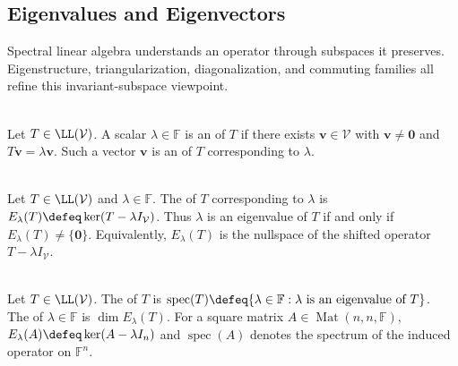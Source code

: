 \subsection{Eigenvalues and Eigenvectors}

%

Spectral linear algebra understands an operator through subspaces it preserves. Eigenstructure, triangularization, diagonalization, and commuting families all refine this invariant-subspace viewpoint.

\begin{definition} \label{def:eigenvalue-eigenvector} \\
Let $T\in\LL(\mathcal{V})$. A scalar $\lambda\in\mathbb{F}$ is an  of $T$ if there exists $\mathbf{v}\in\mathcal{V}$ with $\mathbf{v}\neq\mathbf{0}$ and $T\mathbf{v}=\lambda\mathbf{v}$. Such a vector $\mathbf{v}$ is an  of $T$ corresponding to $\lambda$.
\end{definition}

\begin{definition} \label{def:eigenspace} \\
Let $T\in\LL(\mathcal{V})$ and $\lambda\in\mathbb{F}$. The  of $T$ corresponding to $\lambda$ is $E_{\lambda}(T)\defeq\ker(T-\lambda I_{\mathcal{V}})$. Thus $\lambda$ is an eigenvalue of $T$ if and only if $E_{\lambda}(T)\neq\{\mathbf{0}\}$. Equivalently, $E_{\lambda}(T)$ is the nullspace of the shifted operator $T-\lambda I_{\mathcal{V}}$.
\end{definition}

\begin{definition} \label{def:spectrum-and-geometric-multiplicity} \\
Let $T\in\LL(\mathcal{V})$. The  of $T$ is $\operatorname{spec}(T)\defeq\{\lambda\in\mathbb{F}:\lambda\text{ is an eigenvalue of }T\}$.\\
The  of $\lambda\in\mathbb{F}$ is $\dim E_{\lambda}(T)$. For a square matrix $A\in\operatorname{Mat}(n,n,\mathbb{F})$, $E_{\lambda}(A)\defeq\ker(A-\lambda I_n)$ and $\operatorname{spec}(A)$ denotes the spectrum of the induced operator on $\mathbb{F}^n$.
\end{definition}

